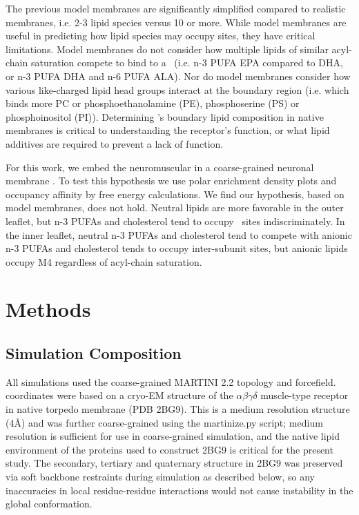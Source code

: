 The previous model membranes are significantly simplified compared to realistic membranes, i.e. 2-3 lipid species versus 10 or more. While model membranes are useful in predicting how lipid species may occupy sites, they have critical limitations. Model membranes do not consider how multiple lipids of similar acyl-chain saturation compete to bind to a \plgic~(i.e. n-3 PUFA EPA compared to DHA, or n-3 PUFA DHA and n-6 PUFA ALA). Nor do model membranes consider how various like-charged lipid head groups interact at the boundary region (i.e. which binds more PC or phosphoethanolamine (PE), phosphoserine (PS) or phosphoinositol (PI)). Determining \nachr's boundary lipid composition in native membranes is critical to understanding the receptor's function, or what lipid additives are required to prevent a lack of function.

For this work, we embed the neuromuscular \nachr\cite{Unwin2005} in a coarse-grained neuronal membrane \cite{Ingolfsson2017b}. To test this hypothesis we use polar enrichment density plots and occupancy affinity by free energy calculations. We find our hypothesis, based on model membranes, does not hold. Neutral lipids are more favorable in the outer leaflet, but n-3 PUFAs and cholesterol tend to occupy \nachr~sites indiscriminately. In the inner leaflet, neutral n-3 PUFAs and cholesterol tend to compete with anionic n-3 PUFAs and cholesterol tends to occupy inter-subunit sites, but anionic lipids occupy M4 regardless of acyl-chain saturation. 

\section{Methods}
\label{lab}

\subsection{Simulation Composition}
All simulations used the coarse-grained MARTINI 2.2\cite{DeJong2012} topology and forcefield.
\nachr~ coordinates were based on a cryo-EM structure of the $\alpha{\beta}\gamma\delta$ muscle-type receptor in native torpedo membrane (PDB 2BG9\cite{Unwin2005}). This is a medium resolution structure (4\AA) and was further coarse-grained using the martinize.py script; medium resolution is sufficient for use in coarse-grained simulation, and the native lipid environment of the proteins used to construct 2BG9 is critical for the present study. The secondary, tertiary and quaternary structure in 2BG9 was preserved via soft backbone restraints during simulation as described below, so any inaccuracies in local residue-residue interactions would not cause instability in the global conformation.  


